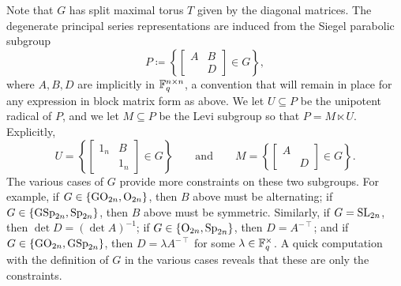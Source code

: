 Note that $G$ has split maximal torus $T$ given by the diagonal matrices. The degenerate principal series representations are induced from the Siegel parabolic subgroup
\[P\coloneqq\left\{\begin{bmatrix}
    A & B \\
      & D
\end{bmatrix}\in G\right\},\]
where $A,B,D$ are implicitly in $\mathbb F_q^{n\times n}$, a convention that will remain in place for any expression in block matrix form as above. We let $U\subseteq P$ be the unipotent radical of $P$, and we let $M\subseteq P$ be the Levi subgroup so that $P=M\ltimes U$. Explicitly,
\[U=\left\{\begin{bmatrix}
    1_n & B \\
      & 1_n
\end{bmatrix}\in G\right\}\qquad\text{and}\qquad M=\left\{\begin{bmatrix}
    A &   \\
      & D
\end{bmatrix}\in G\right\}.\]
The various cases of $G$ provide more constraints on these two subgroups. For example, if $G\in\{\mathrm{GO}_{2n},\mathrm{O}_{2n}\}$, then $B$ above must be alternating; if $G\in\{\mathrm{GSp}_{2n},\mathrm{Sp}_{2n}\}$, then $B$ above must be symmetric. Similarly, if $G=\mathrm{SL}_{2n}$, then $\det D=(\det A)^{-1}$; if $G\in\{\mathrm{O}_{2n},\mathrm{Sp}_{2n}\}$, then $D=A^{-\intercal}$; and if $G\in\{\mathrm{GO}_{2n},\mathrm{GSp}_{2n}\}$, then $D=\lambda A^{-\intercal}$ for some $\lambda\in\mathbb F_q^\times$. A quick computation with the definition of $G$ in the various cases reveals that these are only the constraints.


